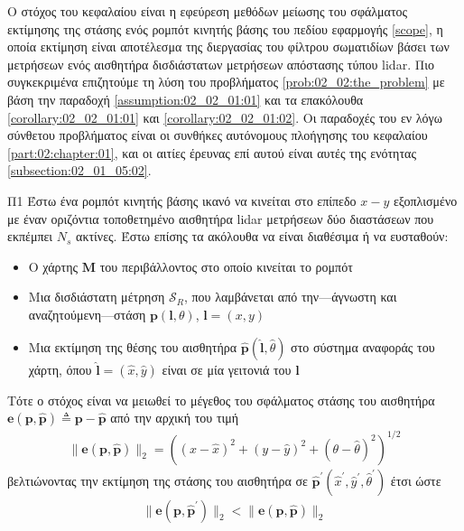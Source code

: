 Ο στόχος του κεφαλαίου είναι η εφεύρεση μεθόδων μείωσης του σφάλματος εκτίμησης
της στάσης ενός ρομπότ κινητής βάσης του πεδίου εφαρμογής \ref{scope}, η οποία
εκτίμηση είναι αποτέλεσμα της διεργασίας του φίλτρου σωματιδίων βάσει των
μετρήσεων ενός αισθητήρα δισδιάστατων μετρήσεων απόστασης τύπου lidar. Πιο
συγκεκριμένα επιζητούμε τη λύση του προβλήματος \ref{prob:02_02:the_problem}
με βάση την παραδοχή \ref{assumption:02_02_01:01} και τα επακόλουθα
\ref{corollary:02_02_01:01} και \ref{corollary:02_02_01:02}. Οι παραδοχές
του εν λόγω σύνθετου προβλήματος είναι οι συνθήκες αυτόνομους πλοήγησης
του κεφαλαίου \ref{part:02:chapter:01}, και οι αιτίες έρευνας επί αυτού
είναι αυτές της ενότητας \ref{subsection:02_01_05:02}.

\begin{bw_box}
\begin{customproblem}{Π1}
  \label{prob:02_02:the_problem}
  Έστω ένα ρομπότ κινητής βάσης ικανό να κινείται στο επίπεδο $x-y$ εξοπλισμένο
  με έναν οριζόντια τοποθετημένο αισθητήρα lidar μετρήσεων δύο διαστάσεων
  που εκπέμπει $N_s$ ακτίνες. Έστω επίσης τα ακόλουθα να είναι διαθέσιμα ή να
  ευσταθούν:
  \begin{itemize}
    \item Ο χάρτης $\bm{M}$ του περιβάλλοντος στο οποίο κινείται το ρομπότ
    \item Μια δισδιάστατη μέτρηση $\mathcal{S}_R$, που λαμβάνεται από
          την---άγνωστη και αναζητούμενη---στάση $\bm{p}(\bm{l},\theta)$,
          $\bm{l} = (x,y)$
    \item Μια εκτίμηση της θέσης του αισθητήρα
          $\hat{\bm{p}}(\hat{\bm{l}}, \hat{\theta})$ στο σύστημα αναφοράς του
          χάρτη, όπου $\hat{\bm{l}} = (\hat{x}, \hat{y})$ είναι σε μία γειτονιά
          του $\bm{l}$
  \end{itemize}
\end{customproblem}
Τότε ο στόχος είναι να μειωθεί το μέγεθος του σφάλματος στάσης του αισθητήρα
$\bm{e}(\bm{p}, \hat{\bm{p}}) \triangleq \bm{p}- \hat{\bm{p}}$ από την αρχική
του τιμή
\begin{align}
  \|\bm{e}(\bm{p}, \hat{\bm{p}})\|_2 = ((x- \hat{x})^2 + (y- \hat{y})^2 + (\theta- \hat{\theta})^2)^{1/2}
  \label{eq:pose_error_def}
\end{align}
βελτιώνοντας την εκτίμηση της στάσης του αισθητήρα σε
$\hat{\bm{p}}^\prime(\hat{x}^\prime, \hat{y}^\prime, \hat{\theta}^\prime)$ έτσι ώστε
\begin{align}
  \|\bm{e}(\bm{p}, \hat{\bm{p}}^\prime)\|_2 < \|\bm{e}(\bm{p}, \hat{\bm{p}})\|_2
  \tag{$\ast$}
  \label{obj:the_objective}
\end{align}
\end{bw_box}
